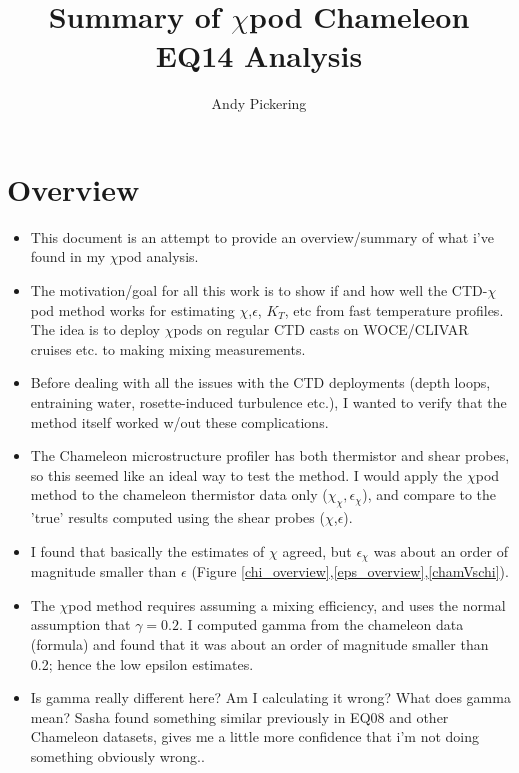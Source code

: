 \documentclass[11pt]{article}
\title{Summary of $\chi$pod Chameleon EQ14 Analysis}
\author{Andy Pickering}
\begin{document}
\maketitle

\tableofcontents
\newpage


\section{Overview}

\begin{itemize}

\item This document is an attempt to provide an overview/summary of what i've found in my $\chi$pod analysis. 

\item The motivation/goal for all this work is to show if and how well the CTD-$\chi$pod method works for estimating $\chi$,$\epsilon$, $K_T$, etc from fast temperature profiles. The idea is to deploy $\chi$pods on regular CTD casts on WOCE/CLIVAR cruises etc. to making mixing measurements.

\item Before dealing with all the issues with the CTD deployments (depth loops, entraining water, rosette-induced turbulence etc.), I wanted to verify that the method itself worked w/out these complications. 

\item The Chameleon microstructure profiler has both thermistor and shear probes, so this seemed like an ideal way to test the method. I would apply the $\chi$pod method to the chameleon thermistor data only ($\chi_{\chi},\epsilon_{\chi}$), and compare to the 'true' results computed using the shear probes ($\chi$,$\epsilon$).

\item I found that basically the estimates of $\chi$ agreed, but $\epsilon_{\chi}$ was about an order of magnitude smaller than $\epsilon$ (Figure \ref{chi_overview},\ref{eps_overview},\ref{chamVschi}).

\item The $\chi$pod method requires assuming a mixing efficiency, and uses the normal assumption that $\gamma=0.2$. I computed gamma from the chameleon data (formula) and found that it was about an order of magnitude smaller than 0.2; hence the low epsilon estimates. 

\item Is gamma really different here? Am I calculating it wrong? What does gamma mean? Sasha found something similar previously in EQ08 and other Chameleon datasets, gives me a little more confidence that i'm not doing something obviously wrong..


\end{itemize}
\end{document}
